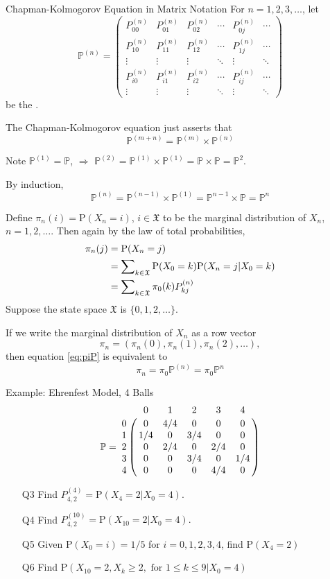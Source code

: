 \documentclass[letterpaper, mathserif, handout]{beamer}
\def\P{\mathbb{P}}
\def\p{\mathrm P}
\def\Sum{\sum\nolimits}
\def\X{\mathfrak{X}}
\begin{document}
\begin{frame}{Chapman-Kolmogorov Equation in Matrix Notation}
For $n=1,2,3,\ldots$, let
$$
\P^{(n)}=
\begin{pmatrix}
P^{(n)}_{00} & P^{(n)}_{01} & P^{(n)}_{02} & \cdots &P^{(n)}_{0j} & \cdots\\
P^{(n)}_{10} & P^{(n)}_{11} & P^{(n)}_{12} & \cdots &P^{(n)}_{1j} & \cdots\\
\vdots & \vdots & \vdots & \ddots &\vdots & \ddots\\
P^{(n)}_{i0} & P^{(n)}_{i1} & P^{(n)}_{i2} & \cdots &P^{(n)}_{ij} & \cdots\\
\vdots & \vdots & \vdots & \ddots &\vdots & \ddots
\end{pmatrix}
$$
be the .

The Chapman-Kolmogorov equation just asserts that
$$\P^{(m+n)}=\P^{(m)}\times \P^{(n)}$$

Note $\P^{(1)}=\P$, $\Rightarrow$ $\P^{(2)}=\P^{(1)}\times \P^{(1)}=\P\times\P=\P^2$.

By induction,
$$\P^{(n)}=\P^{(n-1)}\times \P^{(1)}=\P^{n-1}\times\P=\P^n
$$
\end{frame}
\begin{frame}
Define $\pi_n (i)=\p(X_n=i)$, $i\in\X$ to be the marginal distribution of $X_n$, $n=1,2,\ldots.$
Then again by the law of total probabilities,
\begin{align}
\pi_{n}(j)&=\p(X_{n}=j)\cr
&=\Sum_{k\in\X}\p(X_{0}=k)\p(X_{n}=j|X_0=k)\label{eq:piP}\\
&=\Sum_{k\in\X}\pi_0(k)P_{kj}^{(n)}\nonumber
\end{align}
Suppose the state space $\X$ is $\{0,1,2,\ldots\}.$\par
If we write the marginal distribution of $X_n$ as a row vector
$$
\pi_n=(\pi_n(0),\pi_n(1),\pi_n(2),\ldots),
$$
then equation \eqref{eq:piP} is equivalent to
$$
\pi_n=\pi_0 \P^{(n)}= \pi_0 \P^{n}
$$
\end{frame}
\begin{frame}{Example: Ehrenfest Model, 4 Balls}
$$\P=
\bordermatrix{%
  &  0  &  1  &  2  &  3  &  4 \cr
0 &  0  & 4/4 &  0  &  0  &  0 \cr
1 & 1/4 &  0  & 3/4 &  0  &  0 \cr
2 &  0  & 2/4 &  0  & 2/4 &  0 \cr
3 &  0  &  0  & 3/4 &  0  & 1/4\cr
4 &  0  &  0  &  0  & 4/4 &  0
}
$$
\begin{itemize}
\item[Q3] Find $P^{(4)}_{4,2}=\p(X_4=2|X_0=4).$
\item[Q4] Find $P^{(10)}_{4,2}=\p(X_{10}=2|X_0=4).$
\item[Q5] Given $\p(X_0=i)=1/5$ for $i=0,1,2,3,4$, find $\p(X_4=2)$
\item[Q6] Find $\p(X_{10}=2, X_k\ge 2, \text{ for }1\le k\le 9|X_0=4)$
\end{itemize}
\end{frame}
\end{document}
